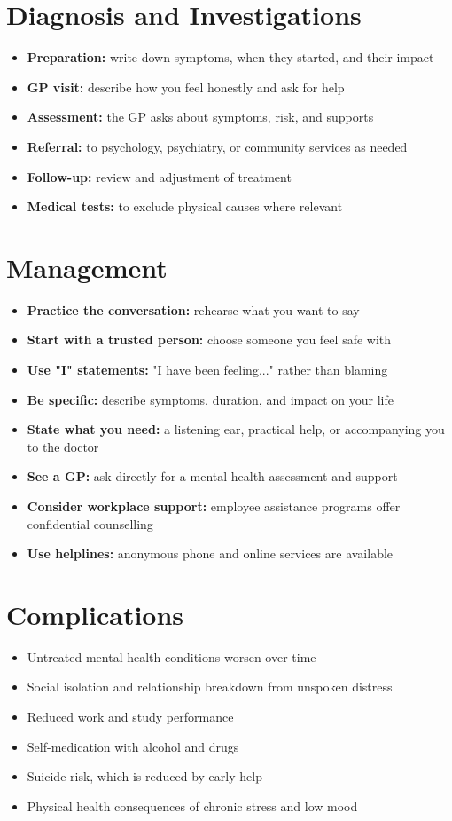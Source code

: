 \section*{Diagnosis and Investigations}
\begin{itemize}
    \item \textbf{Preparation:} write down symptoms, when they started, and their impact
    \item \textbf{GP visit:} describe how you feel honestly and ask for help
    \item \textbf{Assessment:} the GP asks about symptoms, risk, and supports
    \item \textbf{Referral:} to psychology, psychiatry, or community services as needed
    \item \textbf{Follow-up:} review and adjustment of treatment
    \item \textbf{Medical tests:} to exclude physical causes where relevant
\end{itemize}

\section*{Management}
\begin{itemize}
    \item \textbf{Practice the conversation:} rehearse what you want to say
    \item \textbf{Start with a trusted person:} choose someone you feel safe with
    \item \textbf{Use "I" statements:} "I have been feeling..." rather than blaming
    \item \textbf{Be specific:} describe symptoms, duration, and impact on your life
    \item \textbf{State what you need:} a listening ear, practical help, or accompanying you to the doctor
    \item \textbf{See a GP:} ask directly for a mental health assessment and support
    \item \textbf{Consider workplace support:} employee assistance programs offer confidential counselling
    \item \textbf{Use helplines:} anonymous phone and online services are available
\end{itemize}

\section*{Complications}
\begin{itemize}
    \item Untreated mental health conditions worsen over time
    \item Social isolation and relationship breakdown from unspoken distress
    \item Reduced work and study performance
    \item Self-medication with alcohol and drugs
    \item Suicide risk, which is reduced by early help
    \item Physical health consequences of chronic stress and low mood
\end{itemize}

